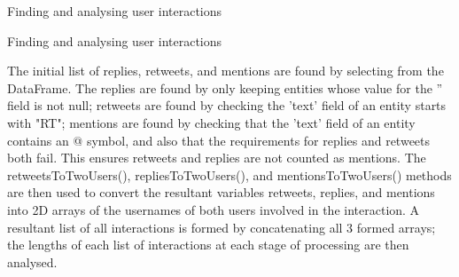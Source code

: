 \documentclass[11pt]{article}
\begin{document}
    Finding and analysing user interactions

    Finding and analysing user interactions

The initial list of replies, retweets, and mentions are found by
selecting from the DataFrame. The replies are found by only keeping
entities whose value for the '' field is not null; retweets are found by
checking the 'text' field of an entity starts with "RT"; mentions are
found by checking that the 'text' field of an entity contains an @
symbol, and also that the requirements for replies and retweets both
fail. This ensures retweets and replies are not counted as mentions. The
retweetsToTwoUsers(), repliesToTwoUsers(), and mentionsToTwoUsers()
methods are then used to convert the resultant variables retweets,
replies, and mentions into 2D arrays of the usernames of both users
involved in the interaction. A resultant list of all interactions is
formed by concatenating all 3 formed arrays; the lengths of each list of
interactions at each stage of processing are then analysed.
\end{document}
